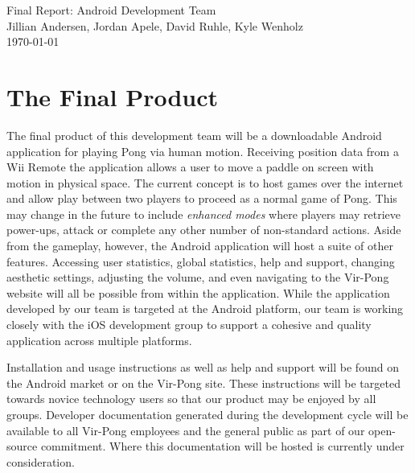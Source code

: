 \documentclass[12pt]{article}
\begin{document}
 \begin{titlepage}
    \vspace*{\fill}
    \begin{center}
      {\Huge Final Report: Android Development Team}\\[0.5cm]
      {\Large Jillian Andersen, Jordan Apele, David Ruhle, Kyle Wenholz}\\[0.4cm]
      \today
    \end{center}
    \vspace*{\fill}
  \end{titlepage}
  
\tableofcontents
\newpage


\section{The Final Product}
\label{sec:finalProduct}

The final product of this development team will be a downloadable Android 
application for playing Pong via human motion.  Receiving position data 
from a Wii Remote the application allows a user to move a paddle on screen 
with motion in physical space.  The current concept is to host games over 
the internet and allow play between two players to proceed as a normal game
 of Pong.  This may change in the future to include \textit{enhanced modes} 
where players may retrieve power-ups, attack or complete any other number 
of non-standard actions.  Aside from the gameplay, however, the Android 
application will host a suite of other features.  Accessing user statistics, 
global statistics, help and support, changing aesthetic settings, adjusting 
the volume, and even navigating to the Vir-Pong website will all be possible 
from within the application.  While the application developed by our team is 
targeted at the Android platform, our team is working closely with the iOS 
development group to support a cohesive and quality application across 
multiple platforms.  

Installation and usage instructions as well as help and support will be 
found on the Android market or on the Vir-Pong site.  These instructions 
will be targeted towards novice technology users so that our product may be
 enjoyed by all groups.  Developer documentation generated during the 
development cycle will be available to all Vir-Pong employees and the 
general public as part of our open-source commitment.  
Where this documentation will be hosted is currently under consideration.  
\end{document}
